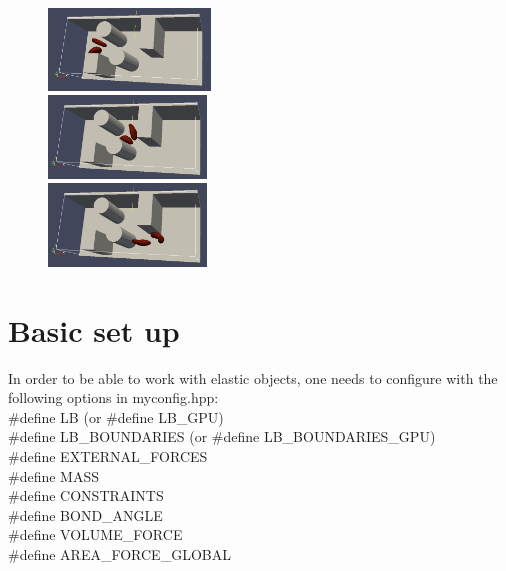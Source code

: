 \documentclass[
a4paper,                        %
11pt,                           %
twoside,                        %
footsepline,                    %
headsepline,                    %
headexclude,                    %
footexclude,                    %
pagesize,                       %
]{scrartcl}
\begin{document}
\begin{figure}[htbp]
  \hfill
  \begin{minipage}[t]{.32\textwidth}

      \includegraphics[width=4.3cm,right]{figures/1.png}

  \end{minipage}
  \hfill
  \begin{minipage}[t]{.32\textwidth}
   \begin{center}  
      \includegraphics[width=4.2cm]{figures/2.png}     
    \end{center}
  \end{minipage}
  \hfill
  \begin{minipage}[t]{.32\textwidth}

      \includegraphics[width=4.2cm,left]{figures/3.png} 

  \end{minipage}
  \hfill
\end{figure} 

\section{Basic set up}

In order to be able to work with elastic objects, one needs to configure \es with the following options in myconfig.hpp:\\
\#define LB (or \#define LB\_GPU)\\
\#define LB\_BOUNDARIES (or \#define LB\_BOUNDARIES\_GPU)\\
\#define EXTERNAL\_FORCES\\
\#define MASS\\
\#define CONSTRAINTS\\
\#define BOND\_ANGLE\\
\#define VOLUME\_FORCE\\
\#define AREA\_FORCE\_GLOBAL\\
\end{document}
